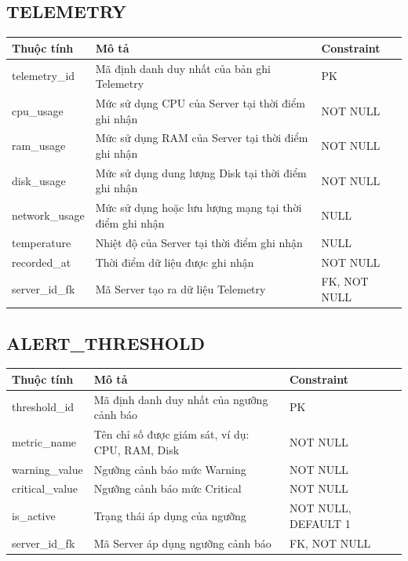 \subsection{TELEMETRY}
\begin{center}
\begin{longtable}{|>{\raggedright\arraybackslash}p{3.5cm}|>{\raggedright\arraybackslash}p{6.5cm}|>{\raggedright\arraybackslash}p{4.5cm}|}
\hline
\textbf{Thuộc tính} & \textbf{Mô tả} & \textbf{Constraint} \\ \hline
\endhead
telemetry\_id & Mã định danh duy nhất của bản ghi Telemetry & PK \\ \hline
cpu\_usage & Mức sử dụng CPU của Server tại thời điểm ghi nhận & NOT NULL \\ \hline
ram\_usage & Mức sử dụng RAM của Server tại thời điểm ghi nhận & NOT NULL \\ \hline
disk\_usage & Mức sử dụng dung lượng Disk tại thời điểm ghi nhận & NOT NULL \\ \hline
network\_usage & Mức sử dụng hoặc lưu lượng mạng tại thời điểm ghi nhận & NULL \\ \hline
temperature & Nhiệt độ của Server tại thời điểm ghi nhận & NULL \\ \hline
recorded\_at & Thời điểm dữ liệu được ghi nhận & NOT NULL \\ \hline
server\_id\_fk & Mã Server tạo ra dữ liệu Telemetry & FK, NOT NULL \\ \hline
\end{longtable}
\end{center}

\subsection{ALERT\_THRESHOLD}
\begin{center}
\begin{longtable}{|>{\raggedright\arraybackslash}p{3.5cm}|>{\raggedright\arraybackslash}p{6.5cm}|>{\raggedright\arraybackslash}p{4.5cm}|}
\hline
\textbf{Thuộc tính} & \textbf{Mô tả} & \textbf{Constraint} \\ \hline
\endhead
threshold\_id & Mã định danh duy nhất của ngưỡng cảnh báo & PK \\ \hline
metric\_name & Tên chỉ số được giám sát, ví dụ: CPU, RAM, Disk & NOT NULL \\ \hline
warning\_value & Ngưỡng cảnh báo mức Warning & NOT NULL \\ \hline
critical\_value & Ngưỡng cảnh báo mức Critical & NOT NULL \\ \hline
is\_active & Trạng thái áp dụng của ngưỡng & NOT NULL, DEFAULT 1 \\ \hline
server\_id\_fk & Mã Server áp dụng ngưỡng cảnh báo & FK, NOT NULL \\ \hline
\end{longtable}
\end{center}

